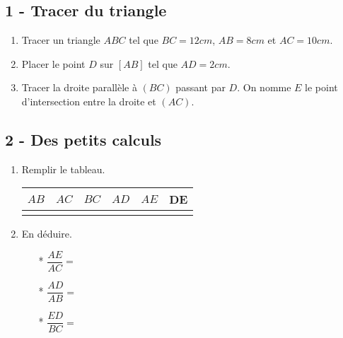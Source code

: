 \documentclass[11pt]{article}
\begin{document}

\setlength{\columnseprule}{1pt}

\subsection*{1 - Tracer du triangle}

\begin{enumerate}
\item Tracer un triangle $ABC$ tel que $BC = 12cm$, $AB = 8cm$ et $AC = 10cm$.
\item Placer le point $D$ sur $[AB]$ tel que $AD = 2cm$.
\item Tracer la droite parallèle à $(BC)$ passant par $D$. On nomme $E$ le point d'intersection entre la droite et $(AC)$.
\end{enumerate}

\subsection*{2 - Des petits calculs}

\begin{enumerate}

\item Remplir le tableau.
  \begin{center}
    \begin{tabular}{| c | c | c | c | c | c |}
      \hline
      $AB$    & $AC$ & $BC$ & $AD$ & $AE$  & DE \\
      \hline
      \phantom{1234567890} & \phantom{1234567890} & \phantom{1234567890} & \phantom{1234567890} & \phantom{1234567890} &  \phantom{1234567890} \\
      \hline
    \end{tabular}
  \end{center}

\item En déduire.
  \begin{multicols}{3}
    \begin{itemize}
    \item[*] $\dfrac{AE}{AC} = $
    \item[*] $\dfrac{AD}{AB} = $
    \item[*] $\dfrac{ED}{BC} = $
    \end{itemize}
  \end{multicols}
\end{enumerate}
\end{document}
